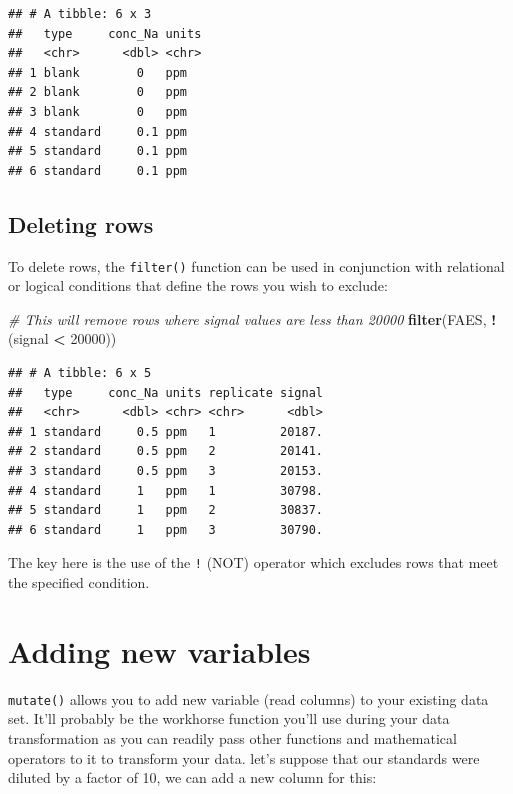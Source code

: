 \documentclass[
]{book}
\newenvironment{Shaded}{\begin{snugshade}}{\end{snugshade}}
\newcommand{\CommentTok}[1]{\textcolor[rgb]{0.56,0.35,0.01}{\textit{#1}}}
\newcommand{\DecValTok}[1]{\textcolor[rgb]{0.00,0.00,0.81}{#1}}
\newcommand{\FunctionTok}[1]{\textcolor[rgb]{0.13,0.29,0.53}{\textbf{#1}}}
\newcommand{\NormalTok}[1]{#1}
\newcommand{\SpecialCharTok}[1]{\textcolor[rgb]{0.81,0.36,0.00}{\textbf{#1}}}
\begin{document}
\begin{verbatim}
## # A tibble: 6 x 3
##   type     conc_Na units
##   <chr>      <dbl> <chr>
## 1 blank        0   ppm  
## 2 blank        0   ppm  
## 3 blank        0   ppm  
## 4 standard     0.1 ppm  
## 5 standard     0.1 ppm  
## 6 standard     0.1 ppm
\end{verbatim}

\hypertarget{deleting-rows}{%
\subsection{Deleting rows}\label{deleting-rows}}

To delete rows, the \texttt{filter()} function can be used in conjunction with relational or logical conditions that define the rows you wish to exclude:

\begin{Shaded}
\begin{Highlighting}[]
\CommentTok{\# This will remove rows where \textquotesingle{}signal\textquotesingle{} values are less than 20000}
\FunctionTok{filter}\NormalTok{(FAES, }\SpecialCharTok{!}\NormalTok{(signal }\SpecialCharTok{\textless{}} \DecValTok{20000}\NormalTok{))}
\end{Highlighting}
\end{Shaded}

\begin{verbatim}
## # A tibble: 6 x 5
##   type     conc_Na units replicate signal
##   <chr>      <dbl> <chr> <chr>      <dbl>
## 1 standard     0.5 ppm   1         20187.
## 2 standard     0.5 ppm   2         20141.
## 3 standard     0.5 ppm   3         20153.
## 4 standard     1   ppm   1         30798.
## 5 standard     1   ppm   2         30837.
## 6 standard     1   ppm   3         30790.
\end{verbatim}

The key here is the use of the \texttt{!} (NOT) operator which excludes rows that meet the specified condition.

\hypertarget{adding-new-variables}{%
\section{Adding new variables}\label{adding-new-variables}}

\texttt{mutate()} allows you to add new variable (read columns) to your existing data set. It'll probably be the workhorse function you'll use during your data transformation as you can readily pass other functions and mathematical operators to it to transform your data. let's suppose that our standards were diluted by a factor of 10, we can add a new column for this:
\end{document}
